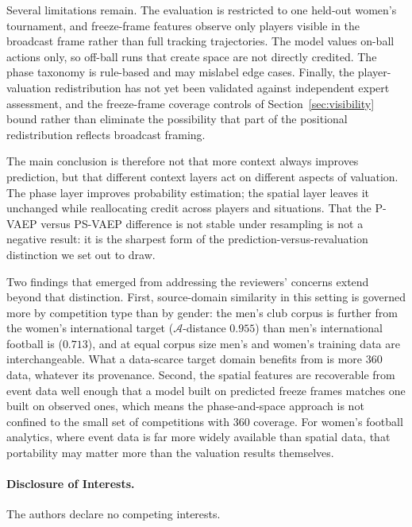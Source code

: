 \documentclass[runningheads]{llncs}
\begin{document}
Several limitations remain. The evaluation is restricted to one held-out women's tournament, and freeze-frame features observe only players visible in the broadcast frame rather than full tracking trajectories. The model values on-ball actions only, so off-ball runs that create space are not directly credited. The phase taxonomy is rule-based and may mislabel edge cases. Finally, the player-valuation redistribution has not yet been validated against independent expert assessment, and the freeze-frame coverage controls of Section~\ref{sec:visibility} bound rather than eliminate the possibility that part of the positional redistribution reflects broadcast framing.

The main conclusion is therefore not that more context always improves prediction, but that different context layers act on different aspects of valuation. The phase layer improves probability estimation; the spatial layer leaves it unchanged while reallocating credit across players and situations. That the P-VAEP versus PS-VAEP difference is not stable under resampling is not a negative result: it is the sharpest form of the prediction-versus-revaluation distinction we set out to draw.

Two findings that emerged from addressing the reviewers' concerns extend beyond that distinction. First, source-domain similarity in this setting is governed more by competition type than by gender: the men's club corpus is further from the women's international target ($\mathcal{A}$-distance $0.955$) than men's international football is ($0.713$), and at equal corpus size men's and women's training data are interchangeable. What a data-scarce target domain benefits from is more 360 data, whatever its provenance. Second, the spatial features are recoverable from event data well enough that a model built on predicted freeze frames matches one built on observed ones, which means the phase-and-space approach is not confined to the small set of competitions with 360 coverage. For women's football analytics, where event data is far more widely available than spatial data, that portability may matter more than the valuation results themselves.

\paragraph{Disclosure of Interests.}
The authors declare no competing interests.



\end{document}
